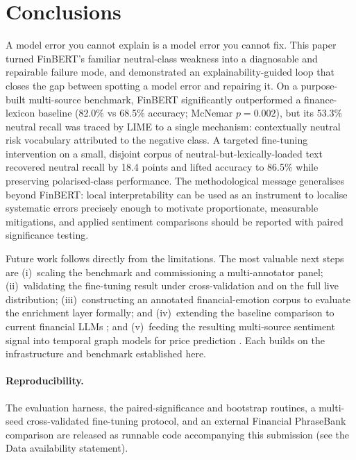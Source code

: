 \documentclass{aims}
\numberwithin{equation}{section}
\begin{document}
\section{Conclusions}\label{sec:conclusion}
A model error you cannot explain is a model error you cannot fix. This paper turned
FinBERT's familiar neutral-class weakness into a diagnosable and repairable failure
mode, and demonstrated an explainability-guided loop that closes the gap between
spotting a model error and repairing it. On a purpose-built multi-source benchmark, FinBERT significantly
outperformed a finance-lexicon baseline (82.0\% vs 68.5\% accuracy; McNemar
$p = 0.002$), but its 53.3\% neutral recall was traced by LIME to a single mechanism:
contextually neutral risk vocabulary attributed to the negative class. A targeted
fine-tuning intervention on a small, disjoint corpus of neutral-but-lexically-loaded
text recovered neutral recall by 18.4 points and lifted accuracy to 86.5\% while
preserving polarised-class performance. The methodological message generalises beyond
FinBERT: local interpretability can be used as an instrument to localise systematic
errors precisely enough to motivate proportionate, measurable mitigations, and
applied sentiment comparisons should be reported with paired significance testing.

Future work follows directly from the limitations. The most valuable next steps are
(i)~scaling the benchmark and commissioning a multi-annotator panel; (ii)~validating
the fine-tuning result under cross-validation and on the full live distribution;
(iii)~constructing an annotated financial-emotion corpus to evaluate the enrichment
layer formally; and (iv)~extending the baseline comparison to current financial LLMs
\citep{wu2023,fatouros2023}; and (v)~feeding the resulting multi-source sentiment
signal into temporal graph models for price prediction \citep{lynch2025}. Each builds
on the infrastructure and benchmark established here.

\paragraph{Reproducibility.}\label{sec:reprod}
The evaluation harness, the paired-significance and bootstrap routines, a multi-seed
cross-validated fine-tuning protocol, and an external Financial PhraseBank
comparison are released as runnable code accompanying this submission (see the Data
availability statement).
\end{document}
